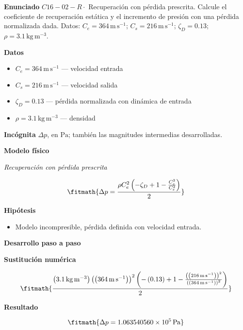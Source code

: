 \documentclass[10pt,openany]{book}
\begin{document}
\begin{tcolorbox}[title={Problema resuelto 2}, studiumworked, breakable]

\noindent\textbf{Enunciado}
\(C16-02-R \cdot\) Recuperación con pérdida prescrita. Calcule el coeficiente de recuperación estática y el incremento de presión con una pérdida normalizada dada. Datos: \(C_e=364\, \mathrm{m}\,\mathrm{s}^{-1}\); \(C_s=216\, \mathrm{m}\,\mathrm{s}^{-1}\); \(\zeta_D=0.13\); \(\rho=3.1\, \mathrm{kg}\,\mathrm{m}^{-3}\).

\noindent\textbf{Datos}
\begin{itemize}
\item $C_e = 364\,\mathrm{m}\,\mathrm{s}^{-1}$ — velocidad entrada
\item $C_s = 216\,\mathrm{m}\,\mathrm{s}^{-1}$ — velocidad salida
\item $\zeta_D = 0.13$ — pérdida normalizada con dinámica de entrada
\item $\rho = 3.1\,\mathrm{kg}\,\mathrm{m}^{-3}$ — densidad
\end{itemize}

\noindent\textbf{Incógnita}
$\Delta p$, en $\mathrm{Pa}$; también las magnitudes intermedias desarrolladas.

\noindent\textbf{Modelo físico}

\noindent\textit{Recuperación con pérdida prescrita}

\[
\fitmath{\Delta p=\frac{\rho C_e^{2} \left(- \zeta_D + 1 - \frac{C_s^{2}}{C_e^{2}}\right)}{2}}
\]

\noindent\textbf{Hipótesis}
\begin{itemize}
\item Modelo incompresible, pérdida definida con velocidad entrada.
\end{itemize}

\noindent\textbf{Desarrollo paso a paso}



\noindent\textbf{Sustitución numérica}

\[
\fitmath{\frac{\left(3.1\,\mathrm{kg}\,\mathrm{m}^{-3}\right) \left(\left(364\,\mathrm{m}\,\mathrm{s}^{-1}\right)\right)^{2} \left(- \left(0.13\right) + 1 - \frac{\left(\left(216\,\mathrm{m}\,\mathrm{s}^{-1}\right)\right)^{2}}{\left(\left(364\,\mathrm{m}\,\mathrm{s}^{-1}\right)\right)^{2}}\right)}{2}}
\]

\noindent\textbf{Resultado}

\[
\fitmath{\Delta p=1.063540560\times10^{5}\,\mathrm{Pa}}
\]


\end{tcolorbox}
\end{document}

